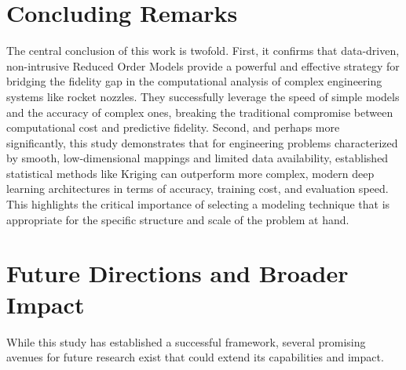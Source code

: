 \documentclass[tg, EN]{ufabcFHZh_tg}
\begin{document}
\section{Concluding Remarks}

The central conclusion of this work is twofold. First, it confirms that data-driven, non-intrusive Reduced Order Models provide a powerful and effective strategy for bridging the fidelity gap in the computational analysis of complex engineering systems like rocket nozzles. They successfully leverage the speed of simple models and the accuracy of complex ones, breaking the traditional compromise between computational cost and predictive fidelity. Second, and perhaps more significantly, this study demonstrates that for engineering problems characterized by smooth, low-dimensional mappings and limited data availability, established statistical methods like Kriging can outperform more complex, modern deep learning architectures in terms of accuracy, training cost, and evaluation speed. This highlights the critical importance of selecting a modeling technique that is appropriate for the specific structure and scale of the problem at hand.

\section{Future Directions and Broader Impact}

While this study has established a successful framework, several promising avenues for future research exist that could extend its capabilities and impact.
\end{document}
